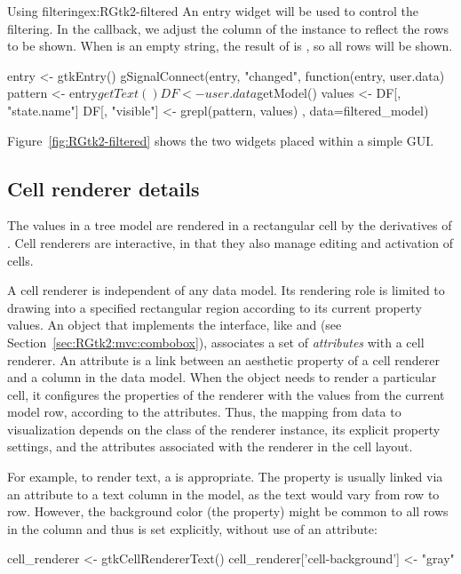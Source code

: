 \begin{example}{Using filtering}{ex:RGtk2-filtered}
An entry widget will be used to control the filtering. In the
callback, we adjust the  column of the
 instance to reflect the rows to be shown. When
 is an empty string, the result of  is 
, so all rows will be shown.
\begin{Schunk}
\begin{Sinput}
 entry <- gtkEntry()
 gSignalConnect(entry, "changed", function(entry, user.data) {
   pattern <- entry$getText()
   DF <- user.data$getModel()
   values <- DF[, "state.name"]
   DF[, "visible"] <- grepl(pattern, values)
 }, data=filtered_model)
\end{Sinput}
\end{Schunk}


Figure~\ref{fig:RGtk2-filtered} shows the two widgets placed within a
simple GUI.
\end{example}

\subsection{Cell renderer details}
\label{sec:RGtk2:cellrenderers}

The values in a tree model are rendered in a rectangular cell by the
derivatives of . Cell renderers are
interactive, in that they also manage editing and activation of cells.

A cell renderer is independent of any data model. Its rendering role
is limited to drawing into a specified rectangular region according to
its current property values. An object that implements the
 interface, like  and
 (see Section~\ref{sec:RGtk2:mvc:combobox}),
associates a set of \emph{attributes} with a cell renderer. An
attribute is a link between an aesthetic property of a cell renderer
and a column in the data model. When the  object
needs to render a particular cell, it configures the properties of the
renderer with the values from the current model row, according to the
attributes. Thus, the mapping from data to visualization depends on
the class of the renderer instance, its explicit property settings,
and the attributes associated with the renderer in the cell layout.

For example, to render text, a  is
appropriate. The  property is usually linked via an
attribute to a text column in the model, as the text would vary from
row to row. However, the background color (the 
property) might be common to all rows in the column and thus is set
explicitly, without use of an attribute:
\begin{Schunk}
\begin{Sinput}
 cell_renderer <- gtkCellRendererText()
 cell_renderer['cell-background'] <- "gray"
\end{Sinput}
\end{Schunk}

